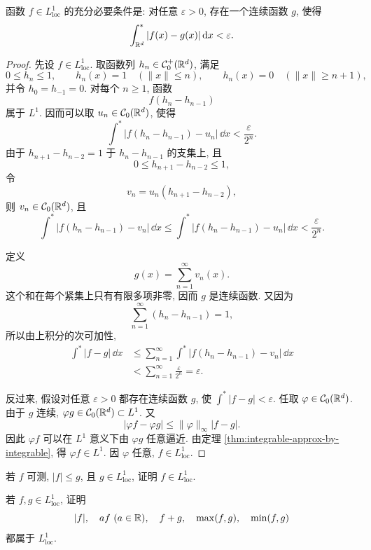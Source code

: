 \begin{thm}\label{thm:locally-integrable-continuous-approx}
	函数 \(f\in L^1_{\operatorname{loc}}\) 的充分必要条件是: 对任意 \(\varepsilon>0\), 存在一个连续函数 \(g\), 使得
	\[
	\int_{\mathbb{R}^d}^{*}|f(x)-g(x)|\,\dd x<\varepsilon.
	\]
\end{thm}

\begin{proof}
	先设 \(f\in L^1_{\operatorname{loc}}\). 取函数列 \(h_n\in\mathcal{C}_0^+(\mathbb{R}^d)\), 满足
	\[
	0\leq h_n\leq 1,
	\qquad
	h_n(x)=1 \quad (\|x\|\leq n),
	\qquad
	h_n(x)=0 \quad (\|x\|\geq n+1),
	\]
	并令 \(h_0=h_{-1}=0\). 对每个 \(n\geq1\), 函数
	\[
	f(h_n-h_{n-1})
	\]
	属于 \(L^1\). 因而可以取 \(u_n\in\mathcal{C}_0(\mathbb{R}^d)\), 使得
	\[
	\int^*\left|f(h_n-h_{n-1})-u_n\right|\,\dd x
	<\frac{\varepsilon}{2^n}.
	\]
	由于 \(h_{n+1}-h_{n-2}=1\) 于 \(h_n-h_{n-1}\) 的支集上, 且
	\[
	0\leq h_{n+1}-h_{n-2}\leq1,
	\]
	令
	\[
	v_n=u_n(h_{n+1}-h_{n-2}),
	\]
	则 \(v_n\in\mathcal{C}_0(\mathbb{R}^d)\), 且
	\[
	\int^*\left|f(h_n-h_{n-1})-v_n\right|\,\dd x
	\leq
	\int^*\left|f(h_n-h_{n-1})-u_n\right|\,\dd x
	<\frac{\varepsilon}{2^n}.
	\]
	
	定义
	\[
	g(x)=\sum_{n=1}^{\infty}v_n(x).
	\]
	这个和在每个紧集上只有有限多项非零, 因而 \(g\) 是连续函数. 又因为
	\[
	\sum_{n=1}^{\infty}(h_n-h_{n-1})=1,
	\]
	所以由上积分的次可加性,
	\begin{align*}
		\int^*|f-g|\,\dd x
		&\leq
		\sum_{n=1}^{\infty}
		\int^*\left|f(h_n-h_{n-1})-v_n\right|\,\dd x\\
		&<\sum_{n=1}^{\infty}\frac{\varepsilon}{2^n}
		=\varepsilon.
	\end{align*}
	
	反过来, 假设对任意 \(\varepsilon>0\) 都存在连续函数 \(g\), 使 \(\int^*|f-g|<\varepsilon\). 任取 \(\varphi\in\mathcal{C}_0(\mathbb{R}^d)\). 由于 \(g\) 连续, \(\varphi g\in\mathcal{C}_0(\mathbb{R}^d)\subset L^1\). 又
	\[
	|\varphi f-\varphi g|
	\leq \|\varphi\|_\infty |f-g|.
	\]
	因此 \(\varphi f\) 可以在 \(L^1\) 意义下由 \(\varphi g\) 任意逼近. 由定理 \ref{thm:integrable-approx-by-integrable}, 得 \(\varphi f\in L^1\). 因 \(\varphi\) 任意, \(f\in L^1_{\operatorname{loc}}\).
\end{proof}

\begin{exer}\label{exer:locally-integrable-dominated}
	若 \(f\) 可测, \(|f|\leq g\), 且 \(g\in L^1_{\operatorname{loc}}\), 证明 \(f\in L^1_{\operatorname{loc}}\).
\end{exer}

\begin{exer}\label{exer:locally-integrable-lattice}
	若 \(f,g\in L^1_{\operatorname{loc}}\), 证明
	\[
	|f|,
	\quad af\ (a\in\mathbb{R}),
	\quad f+g,
	\quad \max(f,g),
	\quad \min(f,g)
	\]
	都属于 \(L^1_{\operatorname{loc}}\).
\end{exer}

